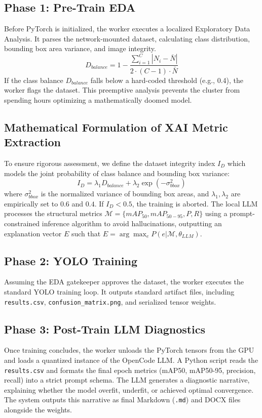 \documentclass[10pt,twocolumn,letterpaper]{article}
\begin{document}
\subsection{Phase 1: Pre-Train EDA}
Before PyTorch is initialized, the worker executes a localized Exploratory Data Analysis. It parses the network-mounted dataset, calculating class distribution, bounding box area variance, and image integrity. 
\begin{equation}
    D_{balance} = 1 - \frac{\sum_{i=1}^{C} |N_i - \bar{N}|}{2 \cdot (C-1) \cdot \bar{N}}
\end{equation}
If the class balance $D_{balance}$ falls below a hard-coded threshold (e.g., 0.4), the worker flags the dataset. This preemptive analysis prevents the cluster from spending hours optimizing a mathematically doomed model.


\subsection{Mathematical Formulation of XAI Metric Extraction}
To ensure rigorous assessment, we define the dataset integrity index $I_D$ which models the joint probability of class balance and bounding box variance:
\begin{equation}
    I_D = \lambda_1 D_{balance} + \lambda_2 \exp(-\sigma_{bbox}^2)
\end{equation}
where $\sigma_{bbox}^2$ is the normalized variance of bounding box areas, and $\lambda_1, \lambda_2$ are empirically set to $0.6$ and $0.4$. If $I_D < 0.5$, the training is aborted. The local LLM processes the structural metrics $\mathcal{M} = \{mAP_{50}, mAP_{50-95}, P, R\}$ using a prompt-constrained inference algorithm to avoid hallucinations, outputting an explanation vector $E$ such that $E = \arg\max_{e} P(e | \mathcal{M}, \theta_{LLM})$.

\subsection{Phase 2: YOLO Training}
Assuming the EDA gatekeeper approves the dataset, the worker executes the standard YOLO training loop. It outputs standard artifact files, including \texttt{results.csv}, \texttt{confusion\_matrix.png}, and serialized tensor weights.

\subsection{Phase 3: Post-Train LLM Diagnostics}
Once training concludes, the worker unloads the PyTorch tensors from the GPU and loads a quantized instance of the OpenCode LLM. A Python script reads the \texttt{results.csv} and formats the final epoch metrics (mAP50, mAP50-95, precision, recall) into a strict prompt schema. The LLM generates a diagnostic narrative, explaining whether the model overfit, underfit, or achieved optimal convergence. The system outputs this narrative as final Markdown (\texttt{.md}) and DOCX files alongside the weights.
\end{document}
